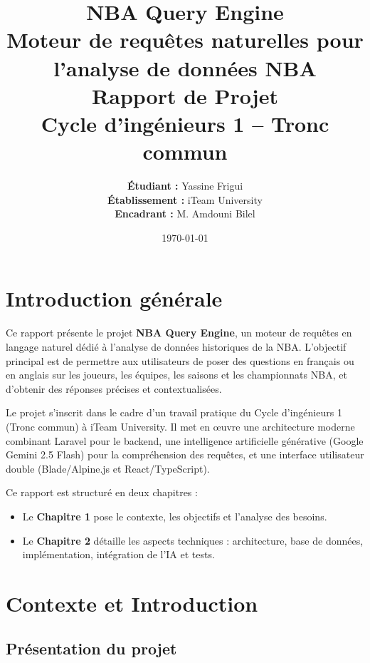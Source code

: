\documentclass[12pt,a4paper]{report}
\title{
    \vspace*{3cm}
    \Huge\textbf{NBA Query Engine}\\[0.5cm]
    \Large{Moteur de requêtes naturelles pour l'analyse de données NBA}\\[1cm]
    \large{Rapport de Projet}\\[0.3cm]
    \large{Cycle d'ingénieurs 1 -- Tronc commun}
}
\author{
    \textbf{Étudiant :} Yassine Frigui\\[0.3cm]
    \textbf{Établissement :} iTeam University\\[0.3cm]
    \textbf{Encadrant :} M. Amdouni Bilel
}
\date{\today}
\begin{document}
\maketitle
\thispagestyle{empty}
\newpage

\tableofcontents
\newpage

\chapter*{Introduction générale}

Ce rapport présente le projet \textbf{NBA Query Engine}, un moteur de requêtes en langage naturel dédié à l'analyse de données historiques de la NBA. L'objectif principal est de permettre aux utilisateurs de poser des questions en français ou en anglais sur les joueurs, les équipes, les saisons et les championnats NBA, et d'obtenir des réponses précises et contextualisées.

Le projet s'inscrit dans le cadre d'un travail pratique du Cycle d'ingénieurs 1 (Tronc commun) à iTeam University. Il met en œuvre une architecture moderne combinant Laravel pour le backend, une intelligence artificielle générative (Google Gemini 2.5 Flash) pour la compréhension des requêtes, et une interface utilisateur double (Blade/Alpine.js et React/TypeScript).

Ce rapport est structuré en deux chapitres :
\begin{itemize}
    \item Le \textbf{Chapitre 1} pose le contexte, les objectifs et l'analyse des besoins.
    \item Le \textbf{Chapitre 2} détaille les aspects techniques : architecture, base de données, implémentation, intégration de l'IA et tests.
\end{itemize}

\newpage

\chapter{Contexte et Introduction}

\section{Présentation du projet}
\end{document}
